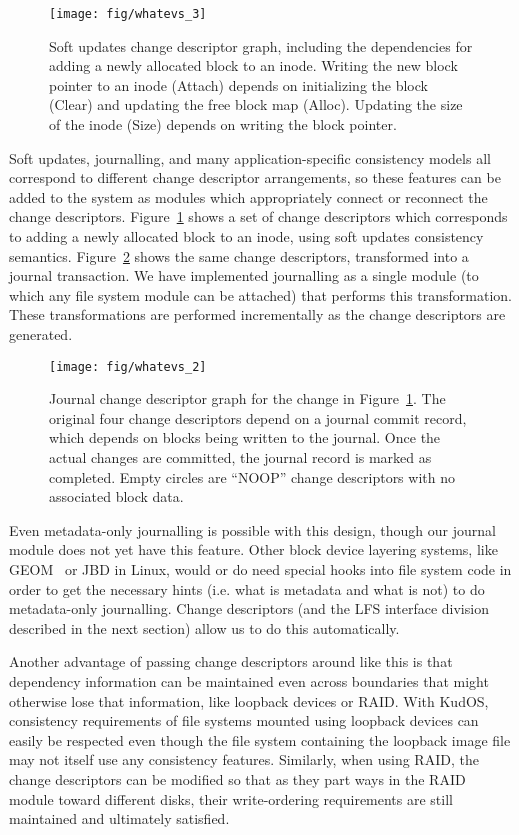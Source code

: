 \begin{figure}[b]
  \centering
  \texttt{[image: fig/whatevs\_3]}%
  \caption{\label{fig:softupdates} Soft updates change descriptor graph,
  including the dependencies for adding a newly allocated block to an
  inode. Writing the new block pointer to an inode (Attach) depends on
  initializing the block (Clear) and updating the free block map (Alloc).
  Updating the size of the inode (Size) depends on writing the block
  pointer.}
\end{figure}

Soft updates, journalling, and many application-specific consistency models all
correspond to different change descriptor arrangements, so these features can be
added to the system as modules which appropriately connect or reconnect the
change descriptors. Figure~\ref{fig:softupdates} shows a set of change
descriptors which corresponds to adding a newly allocated block to an inode,
using soft updates consistency semantics. Figure~\ref{fig:journal} shows the
same change descriptors, transformed into a journal transaction. We have
implemented journalling as a single module (to which any file system module
can be attached) that performs this transformation. These transformations
are performed incrementally as the change descriptors are generated.

\begin{figure}
  \centering
  \texttt{[image: fig/whatevs\_2]}%
  \caption{\label{fig:journal} Journal change descriptor graph for the
  change in Figure~\ref{fig:softupdates}.  The original four change
  descriptors depend on a journal commit record, which depends on blocks
  being written to the journal.  Once the actual changes are committed, the
  journal record is marked as completed.  Empty circles are ``NOOP'' change
  descriptors with no associated block data.  }
\end{figure}

Even metadata-only journalling is possible with this design, though our journal
module does not yet have this feature. Other block device layering systems, like
GEOM~\cite{geom} or JBD in Linux, would or do need special hooks into file system
code in order to get the necessary hints (i.e. what is metadata and what is not)
to do metadata-only journalling. Change descriptors (and the LFS interface
division described in the next section) allow us to do this automatically.

Another advantage of passing change descriptors around like this is that
dependency information can be maintained even across boundaries that might
otherwise lose that information, like loopback devices or RAID. With KudOS,
consistency requirements of file systems mounted using loopback devices can
easily be respected even though the file system containing the loopback image
file may not itself use any consistency features. Similarly, when using RAID,
the change descriptors can be modified so that as they part ways in the RAID
module toward different disks, their write-ordering requirements are still
maintained and ultimately satisfied.

